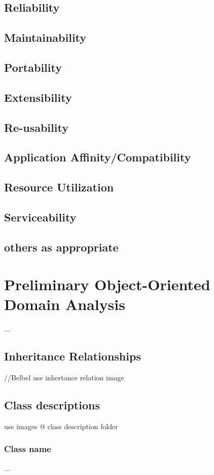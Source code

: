 \documentclass[]{article}
\begin{document}
\subsection {Reliability}
\subsection {Maintainability}
\subsection {Portability}
\subsection {Extensibility}
\subsection {Re-usability}
\subsection {Application Affinity/Compatibility}
\subsection {Resource Utilization}
\subsection {Serviceability}
\subsection {others as appropriate}

\section{Preliminary Object-Oriented Domain Analysis}
...
\subsection{Inheritance Relationships}
//Belbel use inhertance relation image
\subsection{Class descriptions}
use images @ class description folder 
\subsubsection{ Class name}
... 
\end{document}
